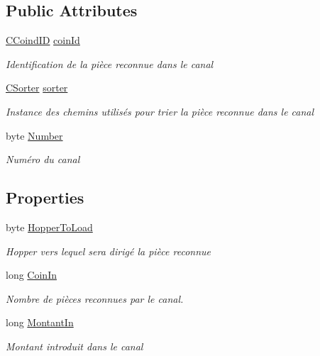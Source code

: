 \subsection*{Public Attributes}
\begin{DoxyCompactItemize}
\item 
\mbox{\hyperlink{class_device_library_1_1_c_canal_1_1_c_coind_i_d}{C\+Coind\+ID}} \mbox{\hyperlink{class_device_library_1_1_c_canal_a5b9fc2885e84a372334c45007f8b5cf8}{coin\+Id}}
\begin{DoxyCompactList}\small\item\em Identification de la pièce reconnue dans le canal \end{DoxyCompactList}\item 
\mbox{\hyperlink{class_device_library_1_1_c_canal_1_1_c_sorter}{C\+Sorter}} \mbox{\hyperlink{class_device_library_1_1_c_canal_a15c9982533901ed86fcc0562a03d67df}{sorter}}
\begin{DoxyCompactList}\small\item\em Instance des chemins utilisés pour trier la pièce reconnue dans le canal \end{DoxyCompactList}\item 
byte \mbox{\hyperlink{class_device_library_1_1_c_canal_a5cb0d553ef6f6edc5a7268b1a427767b}{Number}}
\begin{DoxyCompactList}\small\item\em Numéro du canal \end{DoxyCompactList}\end{DoxyCompactItemize}
\subsection*{Properties}
\begin{DoxyCompactItemize}
\item 
byte \mbox{\hyperlink{class_device_library_1_1_c_canal_a4b920e01736bd1a067401c6cc76e2e4e}{Hopper\+To\+Load}}
\begin{DoxyCompactList}\small\item\em Hopper vers lequel sera dirigé la pièce reconnue \end{DoxyCompactList}\item 
long \mbox{\hyperlink{class_device_library_1_1_c_canal_a01b652a04377f5daeb275adbad9ae1c2}{Coin\+In}}
\begin{DoxyCompactList}\small\item\em Nombre de pièces reconnues par le canal. \end{DoxyCompactList}\item 
long \mbox{\hyperlink{class_device_library_1_1_c_canal_ac80e273e29e18b3f2b598aaf9f04506f}{Montant\+In}}
\begin{DoxyCompactList}\small\item\em Montant introduit dans le canal \end{DoxyCompactList}\end{DoxyCompactItemize}


